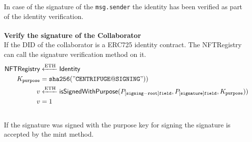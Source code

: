 In case of the signature of the \texttt{msg.sender} the identity has been verified as part of the identity verification.\\\\
\textbf{Verify the signature of the Collaborator} \\
If the DID of the collaborator is a ERC725 identity contract. The NFTRegistry can call the signature verification method on it.
\begin{equation}
\begin{split}
\mathsf{NFTRegistry} &\xleftarrow[]{\text{ETH}}  \mathsf{Identity} \\
K_{\texttt{purpose}} & = \mathtt{sha256("CENTRIFUGE@SIGNING"))} \\
v &\xleftarrow[]{\text{ETH}} \textsf{isSignedWithPurpose}(P_{[\mathtt{signing-root}]\mathtt{field}},P_{[\mathtt{signature}]\mathtt{field}},K_{\texttt{purpose}}))\\
v & = 1
\end{split}
\end{equation}
\\
If the signature was signed with the purpose key for signing the signature is accepted by the mint method.

